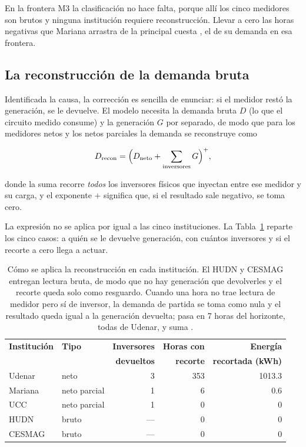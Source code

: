 En la frontera M3 la clasificación no hace falta, porque allí los cinco
medidores son brutos y ninguna institución requiere reconstrucción.
Llevar a cero las horas negativas que Mariana arrastra de la principal
cuesta , el  de su demanda en esa frontera.

\subsection{La reconstrucción de la demanda bruta}
\label{sub:prep-reconstruccion}

Identificada la causa, la corrección es sencilla de enunciar: si el medidor
restó la generación, se le devuelve. El modelo necesita la demanda bruta
$D$ (lo que el circuito medido consume) y la generación $G$ por separado, de
modo que para los medidores netos y los netos parciales la demanda se
reconstruye como

\begin{equation}
 D_{\text{recon}}
 = \Bigl(D_{\text{neto}} + \sum_{\text{inversores}} G \Bigr)^{+},
 \label{eq:prep-reconstruccion}
\end{equation}

donde la suma recorre \emph{todos} los inversores físicos que inyectan
entre ese medidor y su carga, y el exponente $+$ significa que, si el
resultado sale negativo, se toma cero.

La expresión no se aplica por igual a las cinco instituciones. La
Tabla~\ref{tab:prep-reconstruccion} reparte los cinco casos: a quién se le
devuelve generación, con cuántos inversores y si el recorte a cero llega a
actuar.

\begin{table}[H]
 \centering
 \caption{Cómo se aplica la reconstrucción en cada institución. El HUDN y
 CESMAG entregan lectura bruta, de modo que no hay generación que
 devolverles y el recorte queda solo como resguardo. Cuando una hora no
 trae lectura de medidor pero sí de inversor, la demanda de partida se
 toma como nula y el resultado queda igual a la generación devuelta; pasa
 en \num{7} horas del horizonte, todas de Udenar, y suma .}
 \label{tab:prep-reconstruccion}
 \small
 \begin{tabular}{@{}l l r r r@{}}
 \toprule
 \textbf{Institución} & \textbf{Tipo} & \textbf{Inversores} &
 \textbf{Horas con} & \textbf{Energía} \\
 & & \textbf{devueltos} & \textbf{recorte} &
 \textbf{recortada (kWh)} \\
 \midrule
 Udenar & neto & \num{3} & \num{353} & \num{1013,3} \\
 \addlinespace
 Mariana & neto parcial & \num{1} & \num{6} & \num{0,6} \\
 \addlinespace
 UCC & neto parcial & \num{1} & \num{0} & \num{0} \\
 \addlinespace
 HUDN & bruto & --- & \num{0} & \num{0} \\
 \addlinespace
 CESMAG & bruto & --- & \num{0} & \num{0} \\
 \bottomrule
 \end{tabular}
\end{table}

